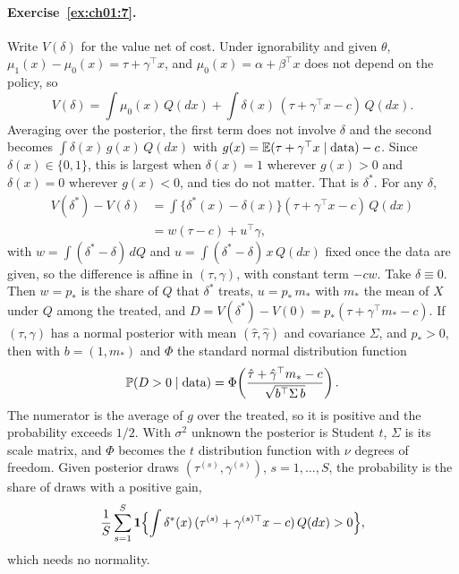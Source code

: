 \paragraph{Exercise~\ref{ex:ch01:7}.} Write $V(\delta)$ for the value net of cost. Under ignorability and given $\theta$, $\mu_1(x) - \mu_0(x) = \tau + \gamma^\top x$, and $\mu_0(x) = \alpha + \beta^\top x$ does not depend on the policy, so
\[
V(\delta) = \int \mu_0(x)\,Q(dx) + \int \delta(x)\,(\tau + \gamma^\top x - c)\,Q(dx).
\]
Averaging over the posterior, the first term does not involve $\delta$ and the second becomes $\int \delta(x)\,g(x)\,Q(dx)$ with $g(x) = \mathbb{E}(\tau + \gamma^\top x \mid \text{data}) - c$. Since $\delta(x) \in \{0, 1\}$, this is largest when $\delta(x) = 1$ wherever $g(x) > 0$ and $\delta(x) = 0$ wherever $g(x) < 0$, and ties do not matter. That is $\delta^\ast$. For any $\delta$,
\begin{align*}
V(\delta^\ast) - V(\delta) &= \int \{\delta^\ast(x) - \delta(x)\}(\tau + \gamma^\top x - c)\,Q(dx)\\
&= w(\tau - c) + u^\top\gamma,
\end{align*}
with $w = \int (\delta^\ast - \delta)\,dQ$ and $u = \int (\delta^\ast - \delta)\,x\,Q(dx)$ fixed once the data are given, so the difference is affine in $(\tau, \gamma)$, with constant term $-cw$. Take $\delta \equiv 0$. Then $w = p_\ast$ is the share of $Q$ that $\delta^\ast$ treats, $u = p_\ast\,m_\ast$ with $m_\ast$ the mean of $X$ under $Q$ among the treated, and $D = V(\delta^\ast) - V(0) = p_\ast(\tau + \gamma^\top m_\ast - c)$. If $(\tau, \gamma)$ has a normal posterior with mean $(\hat\tau, \hat\gamma)$ and covariance $\Sigma$, and $p_\ast > 0$, then with $b = (1, m_\ast)$ and $\Phi$ the standard normal distribution function
\[
\mathbb{P}(D > 0 \mid \text{data}) = \Phi\!\left(\frac{\hat\tau + \hat\gamma^\top m_\ast - c}{\sqrt{b^\top \Sigma\, b}}\right).
\]
The numerator is the average of $g$ over the treated, so it is positive and the probability exceeds $1/2$. With $\sigma^2$ unknown the posterior is Student $t$, $\Sigma$ is its scale matrix, and $\Phi$ becomes the $t$ distribution function with $\nu$ degrees of freedom. Given posterior draws $(\tau^{(s)}, \gamma^{(s)})$, $s = 1, \ldots, S$, the probability is the share of draws with a positive gain,
\[
\frac1S\sum_{s=1}^S \mathbf{1}\Bigl\{\int \delta^\ast(x)\,(\tau^{(s)} + \gamma^{(s)\top}x - c)\,Q(dx) > 0\Bigr\},
\]
which needs no normality.

